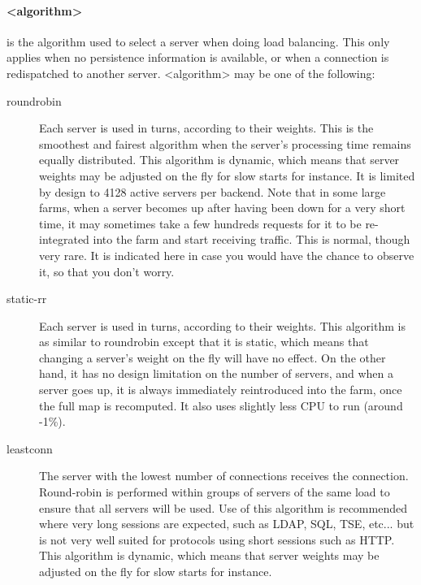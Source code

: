     \paragraph*{<algorithm>}
                is the algorithm used to select a server when doing load
                balancing. This only applies when no persistence information
                is available, or when a connection is redispatched to another
                server. <algorithm> may be one of the following:
      \begin{description}
      \item[roundrobin]
                  Each server is used in turns, according to their weights.
                  This is the smoothest and fairest algorithm when the server's
                  processing time remains equally distributed. This algorithm
                  is dynamic, which means that server weights may be adjusted
                  on the fly for slow starts for instance. It is limited by
                  design to 4128 active servers per backend. Note that in some
                  large farms, when a server becomes up after having been down
                  for a very short time, it may sometimes take a few hundreds
                  requests for it to be re-integrated into the farm and start
                  receiving traffic. This is normal, though very rare. It is
                  indicated here in case you would have the chance to observe
                  it, so that you don't worry.

      \item[static-rr]
                  Each server is used in turns, according to their weights.
                  This algorithm is as similar to roundrobin except that it is
                  static, which means that changing a server's weight on the
                  fly will have no effect. On the other hand, it has no design
                  limitation on the number of servers, and when a server goes
                  up, it is always immediately reintroduced into the farm, once
                  the full map is recomputed. It also uses slightly less CPU to
                  run (around -1\%).

      \item[leastconn]
                  The server with the lowest number of connections receives the
                  connection. Round-robin is performed within groups of servers
                  of the same load to ensure that all servers will be used. Use
                  of this algorithm is recommended where very long sessions are
                  expected, such as LDAP, SQL, TSE, etc... but is not very well
                  suited for protocols using short sessions such as HTTP. This
                  algorithm is dynamic, which means that server weights may be
                  adjusted on the fly for slow starts for instance.


\end{description}
